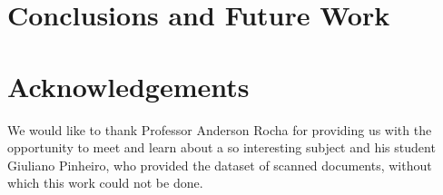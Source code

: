 \documentclass[10pt,twocolumn,letterpaper]{article}
\begin{document}
\section{Conclusions and Future Work}
\label{sec:conclusions}

\section{Acknowledgements}
\label{sec:acknownledgements}

We would like to thank Professor Anderson Rocha for providing us with the opportunity to meet and learn about a so interesting subject and his student Giuliano Pinheiro, who provided the dataset of scanned documents, without which this work could not be done.

{\small


}

\appendix
\end{document}
